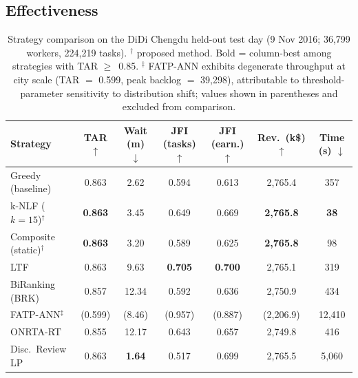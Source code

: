 \subsection{Effectiveness}
\label{sec:overall_results}
\begin{table}[t]
\scriptsize
\renewcommand\arraystretch{1}
\setlength\tabcolsep{2pt}
\caption{Strategy comparison on the DiDi Chengdu held-out test day
  (9 Nov 2016; 36,799 workers, 224,219 tasks).
  $^\dagger$ proposed method. Bold = column-best among strategies with TAR $\geq$~0.85.
  $^\ddagger$ FATP-ANN exhibits degenerate throughput at city scale (TAR $=$ 0.599,
  peak backlog $=$ 39{,}298), attributable to threshold-parameter sensitivity to
  distribution shift; values shown in parentheses and excluded from comparison.}
\label{tab:didi_results}
\begin{tabular}{@{}l cccc c c@{}}
\toprule
\textbf{Strategy}
  & \textbf{TAR} $\uparrow$
  & \textbf{Wait (m)} $\downarrow$
  & \textbf{JFI (tasks)} $\uparrow$
  & \textbf{JFI (earn.)} $\uparrow$
  & \textbf{Rev.\ (k\$)} $\uparrow$
  & \textbf{Time (s)} $\downarrow$ \\
\midrule
Greedy (baseline)
  & 0.863 & 2.62 & 0.594 & 0.613 & 2{,}765.4 & 357 \\
k-NLF ($k{=}15$)$^\dagger$
  & \textbf{0.863} & 3.45 & 0.649 & 0.669 & \textbf{2{,}765.8} & \textbf{38} \\
Composite (static)$^\dagger$
  & \textbf{0.863} & 3.20 & 0.589 & 0.625 & \textbf{2{,}765.8} & 98 \\
\midrule
LTF
  & 0.863 & 9.63 & \textbf{0.705} & \textbf{0.700} & 2{,}765.1 & 319 \\
BiRanking (BRK)
  & 0.857 & 12.34 & 0.592 & 0.636 & 2{,}750.9 & 434 \\
FATP-ANN$^\ddagger$
  & (0.599) & (8.46) & (0.957) & (0.887) & (2{,}206.9) & 12{,}410 \\
ONRTA-RT
  & 0.855 & 12.17 & 0.643 & 0.657 & 2{,}749.8 & 416 \\
Disc.\ Review LP
  & 0.863 & \textbf{1.64} & 0.517 & 0.699 & 2{,}765.5 & 5{,}060 \\
\bottomrule
\end{tabular}
\end{table}


